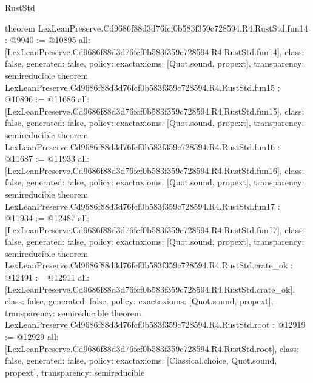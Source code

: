 \begin{lexlean}{RustStd}
\begin{coremodule}
{}
theorem LexLeanPreserve.Cd9686f88d3d76fcf0b583f359c728594.R4.RustStd.fun14 : @9940 := @10895 {
  all: [LexLeanPreserve.Cd9686f88d3d76fcf0b583f359c728594.R4.RustStd.fun14],
  class: false,
  generated: false,
  policy: exact{axioms: [Quot.sound, propext]},
  transparency: semireducible
}
theorem LexLeanPreserve.Cd9686f88d3d76fcf0b583f359c728594.R4.RustStd.fun15 : @10896 := @11686 {
  all: [LexLeanPreserve.Cd9686f88d3d76fcf0b583f359c728594.R4.RustStd.fun15],
  class: false,
  generated: false,
  policy: exact{axioms: [Quot.sound, propext]},
  transparency: semireducible
}
theorem LexLeanPreserve.Cd9686f88d3d76fcf0b583f359c728594.R4.RustStd.fun16 : @11687 := @11933 {
  all: [LexLeanPreserve.Cd9686f88d3d76fcf0b583f359c728594.R4.RustStd.fun16],
  class: false,
  generated: false,
  policy: exact{axioms: [Quot.sound, propext]},
  transparency: semireducible
}
theorem LexLeanPreserve.Cd9686f88d3d76fcf0b583f359c728594.R4.RustStd.fun17 : @11934 := @12487 {
  all: [LexLeanPreserve.Cd9686f88d3d76fcf0b583f359c728594.R4.RustStd.fun17],
  class: false,
  generated: false,
  policy: exact{axioms: [Quot.sound, propext]},
  transparency: semireducible
}
theorem LexLeanPreserve.Cd9686f88d3d76fcf0b583f359c728594.R4.RustStd.crate_ok : @12491 := @12911 {
  all: [LexLeanPreserve.Cd9686f88d3d76fcf0b583f359c728594.R4.RustStd.crate_ok],
  class: false,
  generated: false,
  policy: exact{axioms: [Quot.sound, propext]},
  transparency: semireducible
}
theorem LexLeanPreserve.Cd9686f88d3d76fcf0b583f359c728594.R4.RustStd.root : @12919 := @12929 {
  all: [LexLeanPreserve.Cd9686f88d3d76fcf0b583f359c728594.R4.RustStd.root],
  class: false,
  generated: false,
  policy: exact{axioms: [Classical.choice, Quot.sound, propext]},
  transparency: semireducible
}


\end{coremodule}
\end{lexlean}
